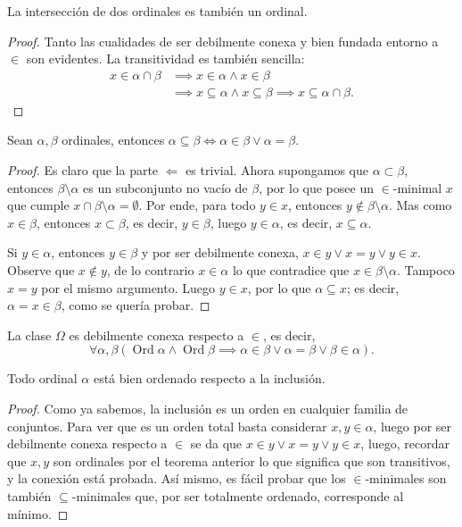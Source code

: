 \documentclass[11pt,a4paper]{book}
\DeclareMathOperator{\Ord}{Ord}
\begin{document}
\begin{lem}
	La intersección de dos ordinales es también un ordinal.
\end{lem}
\begin{proof}
	Tanto las cualidades de ser debilmente conexa y bien fundada entorno a $\in$ son evidentes. La transitividad es también sencilla:
	\begin{align*}
		x\in\alpha\cap\beta&\implies x\in\alpha\wedge x\in\beta\\
		&\implies x\subseteq\alpha\wedge x\subseteq\beta\implies x\subseteq\alpha\cap\beta.
	\end{align*}
\end{proof}
\begin{lem}
	Sean $\alpha,\beta$ ordinales, entonces $\alpha\subseteq\beta\iff\alpha\in\beta\vee\alpha=\beta$.
\end{lem}
\begin{proof}
	Es claro que la parte $\Leftarrow$ es trivial. Ahora supongamos que $\alpha\subset\beta$, entonces $\beta\setminus\alpha$ es un subconjunto no vacío de $\beta$, por lo que posee un $\in$-minimal $x$ que cumple $x\cap\beta\setminus\alpha=\emptyset$. Por ende, para todo $y\in x$, entonces $y\notin\beta\setminus\alpha$. Mas como $x\in\beta$, entonces $x\subset\beta$, es decir, $y\in\beta$, luego $y\in\alpha$, es decir, $x\subseteq\alpha$.

	Si $y\in\alpha$, entonces $y\in\beta$ y por ser debilmente conexa, $x\in y\vee x=y\vee y\in x$. Observe que $x\notin y$, de lo contrario $x\in\alpha$ lo que contradice que $x\in\beta\setminus\alpha$. Tampoco $x=y$ por el mismo argumento. Luego $y\in x$, por lo que $\alpha\subseteq x$; es decir, $\alpha=x\in\beta$, como se quería probar.
\end{proof}
\begin{thm}\label{thm:ordinal-mutual-belonging}
	La clase $\Omega$ es debilmente conexa respecto a $\in$, es decir,
	$$\forall\alpha,\beta(\Ord\alpha\wedge\Ord\beta\implies\alpha\in\beta\vee\alpha=\beta\vee\beta\in\alpha).$$
\end{thm}
\begin{thm}
	Todo ordinal $\alpha$ está bien ordenado respecto a la inclusión.
\end{thm}
\begin{proof}
	Como ya sabemos, la inclusión es un orden en cualquier familia de conjuntos. Para ver que es un orden total basta considerar $x,y\in\alpha$, luego por ser debilmente conexa respecto a $\in$ se da que $x\in y\vee x=y\vee y\in x$, luego, recordar que $x,y$ son ordinales por el teorema anterior lo que significa que son transitivos, y la conexión está probada. Así mismo, es fácil probar que los $\in$-minimales son también $\subseteq$-minimales que, por ser totalmente ordenado, corresponde al mínimo.
\end{proof}
\end{document}
